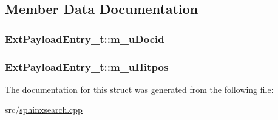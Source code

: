 \subsection{Member Data Documentation}
\hypertarget{structExtPayloadEntry__t_aecbcea8f00f55108436d4df91bb5d9fb}{
\subsubsection[{m\-\_\-u\-Docid}]{ Ext\-Payload\-Entry\-\_\-t\-::m\-\_\-u\-Docid}}\label{structExtPayloadEntry__t_aecbcea8f00f55108436d4df91bb5d9fb}
\hypertarget{structExtPayloadEntry__t_aa8df24ce29a97af5235ab0d33dc213f7}{
\subsubsection[{m\-\_\-u\-Hitpos}]{ Ext\-Payload\-Entry\-\_\-t\-::m\-\_\-u\-Hitpos}}\label{structExtPayloadEntry__t_aa8df24ce29a97af5235ab0d33dc213f7}


The documentation for this struct was generated from the following file\-:\begin{DoxyCompactItemize}
\item 
src/\hyperlink{sphinxsearch_8cpp}{sphinxsearch.\-cpp}\end{DoxyCompactItemize}
